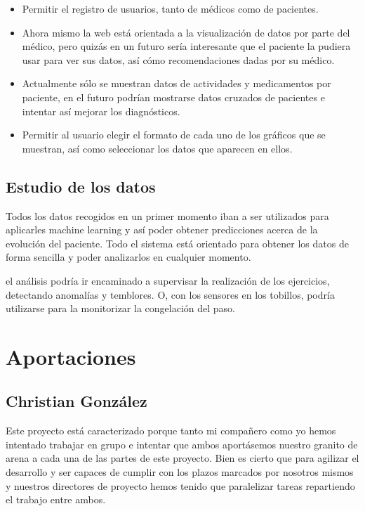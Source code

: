 \documentclass[11pt,spanish]{article}
\begin{document}
\begin{itemize}
	\item Permitir el registro de usuarios, tanto de médicos como de pacientes.
    \item Ahora mismo la web está orientada a la visualización de datos por parte del médico, pero quizás en un futuro sería interesante que el paciente la pudiera usar para ver sus datos, así cómo recomendaciones dadas por su médico.
    \item Actualmente sólo se muestran datos de actividades y medicamentos por paciente, en el futuro podrían mostrarse datos cruzados de pacientes e intentar así mejorar los diagnósticos.
    \item Permitir al usuario elegir el formato de cada uno de los gráficos que se muestran, así como seleccionar los datos que aparecen en ellos.
\end{itemize}

\subsection{Estudio de los datos}
Todos los datos recogidos en un primer momento iban a ser utilizados para aplicarles machine learning y así poder obtener predicciones acerca de la evolución del paciente. Todo el sistema está orientado para obtener los datos de forma sencilla y poder analizarlos en cualquier momento.
\newline

el análisis podría ir encaminado a supervisar la realización de los ejercicios, detectando anomalías y temblores. O, con los sensores en los tobillos, podría utilizarse para la monitorizar la congelación del paso.
\newpage

\section{Aportaciones}
\subsection{Christian González}

Este proyecto está caracterizado porque tanto mi compañero como yo hemos intentado trabajar en grupo e intentar que ambos aportásemos nuestro granito de arena a cada una de las partes de este proyecto. Bien es cierto que para agilizar el desarrollo y ser capaces de cumplir con los plazos marcados por nosotros mismos y nuestros directores de proyecto hemos tenido que paralelizar tareas repartiendo el trabajo entre ambos.
\newline
\end{document}
